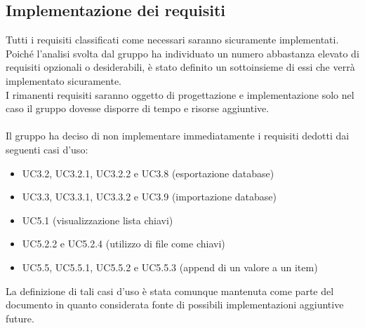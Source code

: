 \documentclass[a4paper]{article}
\begin{document}
	\subsection{Implementazione dei requisiti}
	Tutti i requisiti classificati come necessari saranno sicuramente implementati. 
	\\ Poiché l'analisi svolta dal gruppo ha individuato un numero abbastanza elevato di requisiti opzionali o desiderabili, è stato definito un sottoinsieme di essi che verrà implementato sicuramente.
	\\ I rimanenti requisiti saranno oggetto di progettazione e implementazione solo nel caso il gruppo dovesse disporre di tempo e risorse aggiuntive.
	\\ \\
	Il gruppo ha deciso di non implementare immediatamente i requisiti dedotti dai seguenti casi d'uso:
	\begin{itemize}
	\item UC3.2, UC3.2.1, UC3.2.2 e UC3.8 (esportazione database)
	\item UC3.3, UC3.3.1, UC3.3.2 e UC3.9 (importazione database)
	\item UC5.1 (visualizzazione lista chiavi)
	\item UC5.2.2 e UC5.2.4 (utilizzo di file come chiavi)
	\item UC5.5, UC5.5.1, UC5.5.2 e UC5.5.3 (append di un valore a un item)
	\end{itemize}
	La definizione di tali casi d'uso è stata comunque mantenuta come parte del documento in quanto considerata fonte di possibili implementazioni aggiuntive future.
	\cleardoublepage
	\listoffigures
	
	\cleardoublepage
	\listoftables
		
\end{document}
